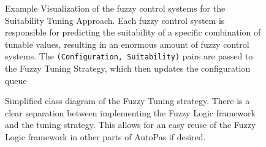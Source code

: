 \begin{figure}[H]

  \caption[Visualization of the fuzzy control systems for the Suitability Tuning Approach]{Example Visualization of the fuzzy control systems for the Suitability Tuning Approach. Each fuzzy control system is responsible for predicting the suitability of a specific combination of tunable values, resulting in an enormous amount of fuzzy control systems. The \texttt{(Configuration, Suitability)} pairs are passed to the Fuzzy Tuning Strategy, which then updates the configuration queue}
  \label{fig:fuzzyControlSystemSuitability}
\end{figure}


\newpage

\begin{figure}[H]
  \centering
  
  \caption[Class diagram of the Fuzzy Tuning Strategy]{Simplified class diagram of the Fuzzy Tuning strategy. There is a clear separation between implementing the Fuzzy Logic framework and the tuning strategy. This allows for an easy reuse of the Fuzzy Logic framework in other parts of AutoPas if desired.}
  \label{fig:classdiagram}
\end{figure}
